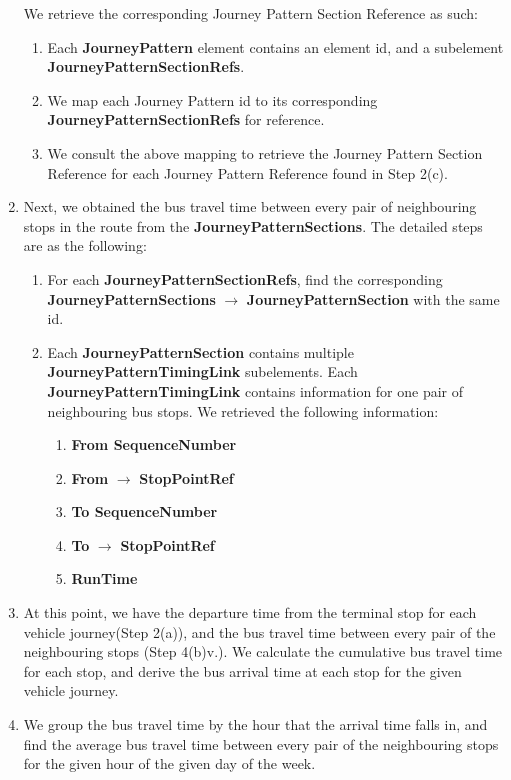 \begin{enumerate}
  We retrieve the corresponding Journey Pattern Section Reference as such:
    \begin{enumerate}
      \item Each \textbf{JourneyPattern} element contains an element id, and a subelement \textbf{JourneyPatternSectionRefs}.
      \item We map each Journey Pattern id to its corresponding \textbf{JourneyPatternSectionRefs} for reference.
      \item We consult the above mapping to retrieve the Journey Pattern Section Reference for each Journey Pattern Reference found in Step 2(c).
    \end{enumerate}
    \item Next, we obtained the bus travel time between every pair of neighbouring stops in the route from the \textbf{JourneyPatternSections}. The detailed steps are as the following:
    \begin{enumerate}
      \item For each \textbf{JourneyPatternSectionRefs}, find the corresponding \textbf{JourneyPatternSections} $\rightarrow$ \textbf{JourneyPatternSection} with the same id.
      \item Each \textbf{JourneyPatternSection} contains multiple \textbf{JourneyPatternTimingLink} subelements. Each \textbf{JourneyPatternTimingLink} contains information for one pair of neighbouring bus stops. We retrieved the following information:
      \begin{enumerate}
        \item \textbf{From SequenceNumber}
        \item \textbf{From} $\rightarrow$ \textbf{StopPointRef}
        \item \textbf{To SequenceNumber}
        \item \textbf{To} $\rightarrow$ \textbf{StopPointRef}
        \item \textbf{RunTime}
      \end{enumerate}
    \end{enumerate}
    \item At this point, we have the departure time from the terminal stop for each vehicle journey(Step 2(a)), and the bus travel time between every pair of the neighbouring stops (Step 4(b)v.). We calculate the cumulative bus travel time for each stop, and derive the bus arrival time at each stop for the given vehicle journey.
    \item We group the bus travel time by the hour that the arrival time falls in, and find the average bus travel time between every pair of the neighbouring stops for the given hour of the given day of the week.
\end{enumerate}



